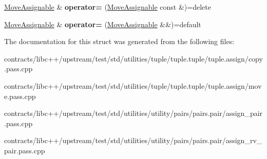 \begin{DoxyCompactItemize}
\item 
\mbox{\label{struct_move_assignable_af054e0089d7507ef81d5d35683621b5f}} 
\mbox{\hyperlink{struct_move_assignable}{Move\+Assignable}} \& {\bfseries operator=} (\mbox{\hyperlink{struct_move_assignable}{Move\+Assignable}} const \&)=delete
\item 
\mbox{\label{struct_move_assignable_aa98b1b46118db63859ddbed9da9737f4}} 
\mbox{\hyperlink{struct_move_assignable}{Move\+Assignable}} \& {\bfseries operator=} (\mbox{\hyperlink{struct_move_assignable}{Move\+Assignable}} \&\&)=default
\end{DoxyCompactItemize}


The documentation for this struct was generated from the following files\+:\begin{DoxyCompactItemize}
\item 
contracts/libc++/upstream/test/std/utilities/tuple/tuple.\+tuple/tuple.\+assign/copy.\+pass.\+cpp\item 
contracts/libc++/upstream/test/std/utilities/tuple/tuple.\+tuple/tuple.\+assign/move.\+pass.\+cpp\item 
contracts/libc++/upstream/test/std/utilities/utility/pairs/pairs.\+pair/assign\+\_\+pair.\+pass.\+cpp\item 
contracts/libc++/upstream/test/std/utilities/utility/pairs/pairs.\+pair/assign\+\_\+rv\+\_\+pair.\+pass.\+cpp\end{DoxyCompactItemize}
